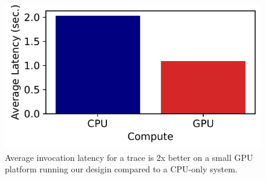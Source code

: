  
\begin{figure}
  \centering
  \includegraphics{mqfq/graphs/cpu_compare/25.7/compute_compare_squish.pdf}
  \caption{Average invocation latency for a trace is 2x better on a small GPU platform running our desigin compared to a CPU-only system.}
    \label{fig:cpu-compare}
\end{figure}
